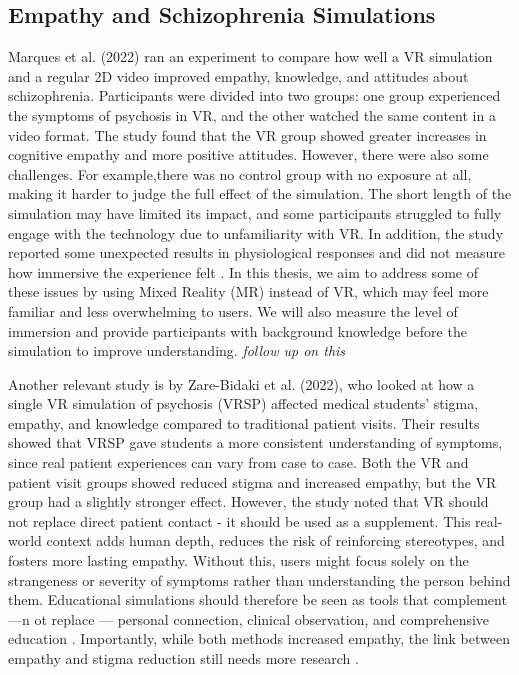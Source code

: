\subsection{Empathy and Schizophrenia Simulations}

Marques et al. (2022) ran an experiment to compare how well a VR simulation and a regular 2D video improved empathy, knowledge, and attitudes about schizophrenia. Participants were divided into two groups: one group experienced the symptoms of psychosis in VR, and the other watched the same content in a video format. The study found that the VR group showed greater increases in cognitive empathy and more positive attitudes. However, there were also some challenges. For example,there was no control group with no exposure at all, making it harder to judge the full effect of the simulation. The short length of the simulation may have limited its impact, and some participants struggled to fully engage with the technology due to unfamiliarity with VR. In addition, the study reported some unexpected results in physiological responses and did not measure how immersive the experience felt \cite{Marques2022}. In this thesis, we aim to address some of these issues by using Mixed Reality (MR) instead of VR, which may feel more familiar and less overwhelming to users. We will also measure the level of immersion and provide participants with background knowledge before the simulation to improve understanding. \emph{follow up on this}

Another relevant study is by Zare-Bidaki et al. (2022), who looked at how a single VR simulation of psychosis (VRSP) affected medical students' stigma, empathy, and knowledge compared to traditional patient visits. Their results showed that VRSP gave students a more consistent understanding of symptoms, since real patient experiences can vary from case to case. Both the VR and patient visit groups showed reduced stigma and increased empathy, but the VR group had a slightly stronger effect. However, the study noted that VR should not replace direct patient contact - it should be used as a supplement. This real-world context adds human depth, reduces the risk of reinforcing stereotypes, and fosters more lasting empathy. Without this, users might focus solely on the strangeness or severity of symptoms rather than understanding the person behind them. Educational simulations should therefore be seen as tools that complement —n ot replace — personal connection, clinical observation, and comprehensive education \cite{Zare-Bidaki2022,Hsia2022}. Importantly, while both methods increased empathy, the link between empathy and stigma reduction still needs more research \cite{Zare-Bidaki2022}.

